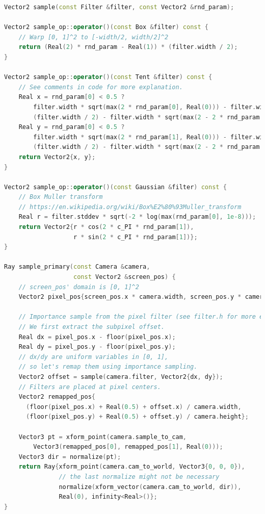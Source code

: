 \begin{lstlisting}[language=c++]
Vector2 sample(const Filter &filter, const Vector2 &rnd_param);

Vector2 sample_op::operator()(const Box &filter) const {
    // Warp [0, 1]^2 to [-width/2, width/2]^2
    return (Real(2) * rnd_param - Real(1)) * (filter.width / 2);
}

Vector2 sample_op::operator()(const Tent &filter) const {
    // See comments in code for more explanation.
    Real x = rnd_param[0] < 0.5 ? 
        filter.width * sqrt(max(2 * rnd_param[0], Real(0))) - filter.width / 2 :
        (filter.width / 2) - filter.width * sqrt(max(2 - 2 * rnd_param[0], Real(0)));
    Real y = rnd_param[0] < 0.5 ? 
        filter.width * sqrt(max(2 * rnd_param[1], Real(0))) - filter.width / 2 :
        (filter.width / 2) - filter.width * sqrt(max(2 - 2 * rnd_param[1], Real(0)));
    return Vector2{x, y};
}

Vector2 sample_op::operator()(const Gaussian &filter) const {
    // Box Muller transform
    // https://en.wikipedia.org/wiki/Box%E2%80%93Muller_transform
    Real r = filter.stddev * sqrt(-2 * log(max(rnd_param[0], 1e-8)));
    return Vector2{r * cos(2 * c_PI * rnd_param[1]),
                   r * sin(2 * c_PI * rnd_param[1])};
}

Ray sample_primary(const Camera &camera,
                   const Vector2 &screen_pos) {
    // screen_pos' domain is [0, 1]^2
    Vector2 pixel_pos{screen_pos.x * camera.width, screen_pos.y * camera.height};

    // Importance sample from the pixel filter (see filter.h for more explanation).
    // We first extract the subpixel offset.
    Real dx = pixel_pos.x - floor(pixel_pos.x);
    Real dy = pixel_pos.y - floor(pixel_pos.y);
    // dx/dy are uniform variables in [0, 1],
    // so let's remap them using importance sampling.
    Vector2 offset = sample(camera.filter, Vector2{dx, dy});
    // Filters are placed at pixel centers.
    Vector2 remapped_pos{
      (floor(pixel_pos.x) + Real(0.5) + offset.x) / camera.width,
      (floor(pixel_pos.y) + Real(0.5) + offset.y) / camera.height};

    Vector3 pt = xform_point(camera.sample_to_cam,
        Vector3(remapped_pos[0], remapped_pos[1], Real(0)));
    Vector3 dir = normalize(pt);
    return Ray{xform_point(camera.cam_to_world, Vector3{0, 0, 0}),
               // the last normalize might not be necessary
               normalize(xform_vector(camera.cam_to_world, dir)),
               Real(0), infinity<Real>()};
}
\end{lstlisting}

